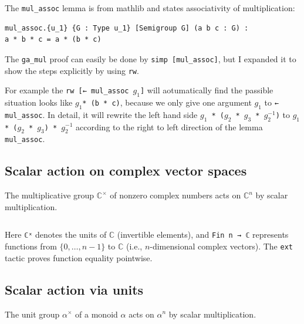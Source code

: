 \documentclass[
  12pt, %
]{assignment}
\newcommand{\leancodeurl}{}
\newcommand{\setleancodeurl}[1]{\renewcommand{\leancodeurl}{#1}}
\newcommand{\leancodefile}[3][]{%
  \setleancodeurl{#3}%
  \inputminted[fontsize=\footnotesize,breaklines,breakanywhere,tabsize=4,showspaces=false,linenos=true,#1]{lean4}{#2}%
}
\begin{document}
\leancodefile[firstline=66,lastline=84,firstnumber=66]{../lean/GroupAction/Examples.lean}{https://github.com/FrankieeW/GroupAction/blob/v1.2.0/lean/GroupAction/Examples.lean}
The \texttt{mul\_assoc} lemma is from mathlib and states associativity of multiplication:

\begin{verbatim}
mul_assoc.{u_1} {G : Type u_1} [Semigroup G] (a b c : G) :
a * b * c = a * (b * c)
\end{verbatim}



The \texttt{ga\_mul} proof can easily be done by \texttt{simp [mul\_assoc]}, but I expanded it to show the steps explicitly by using \texttt{rw}.



For example the \texttt{rw [← mul\_assoc $g_1$]} will aotumatically find the passible situation looks like \texttt{$g_1$* (b * c)}, because we only give one argument \texttt{$g_1$} to \texttt{← mul\_assoc}.
In detail, it will rewrite the left hand side \texttt{$g_1$ * ($g_2$ * $g_3$ * $g_2^{-1}$)} to \texttt{$g_1$ * ($g_2$ * $g_3$) * $g_2^{-1}$} according to the right to left direction of the lemma \texttt{mul\_assoc}.
\subsection{Scalar action on complex vector spaces}
The multiplicative group $\mathbb{C}^\times$ of nonzero complex numbers acts on
$\mathbb{C}^n$ by scalar multiplication.

\leancodefile[firstline=88,lastline=98,firstnumber=88]{../lean/GroupAction/Examples.lean}{https://github.com/FrankieeW/GroupAction/blob/v1.2.0/lean/GroupAction/Examples.lean}

Here \texttt{ℂˣ} denotes the units of $\mathbb{C}$ (invertible elements), and
\texttt{Fin n → ℂ} represents functions from $\{0, \ldots, n-1\}$ to $\mathbb{C}$
(i.e., $n$-dimensional complex vectors). The \texttt{ext} tactic proves function equality
pointwise.

\subsection{Scalar action via units}
The unit group $\alpha^\times$ of a monoid $\alpha$ acts on $\alpha^n$ by scalar multiplication.
\end{document}
